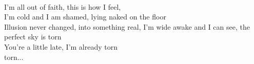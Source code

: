 \\
I'm all out of faith, this is how I feel, \\
I'm cold and I am shamed, lying naked on the floor \\
Illusion never changed, into something real,
I'm wide awake and I can see, the perfect sky is torn \\
You're a little late, I'm already torn \\
torn... \\
\\
